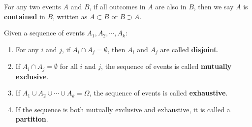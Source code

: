 \documentclass{huhtakm-template-book-v2}
\begin{document}
    \begin{sdefn}
        For any two events $A$ and $B$, if all outcomes in $A$ are also in $B$, then we say $A$ is \textbf{contained} in $B$, written as $A \subset B$ or $B \supset A$.
    \end{sdefn}
    \begin{sdefn}
        Given a sequence of events $A_{1}, A_{2}, \cdots, A_{k}$:
        \begin{enumerate}
            \item For any $i$ and $j$, if $A_{i} \cap A_{j} = \emptyset$, then $A_{i}$ and $A_{j}$ are called \textbf{disjoint}.
            \item If $A_{i} \cap A_{j} = \emptyset$ for all $i$ and $j$, the sequence of events is called \textbf{mutually exclusive}.
            \item If $A_{1} \cup A_{2} \cup \cdots \cup A_{k} = \Omega$, the sequence of events is called \textbf{exhaustive}.
            \item If the sequence is both mutually exclusive and exhaustive, it is called a \textbf{partition}.
        \end{enumerate}
    \end{sdefn}
    \newpage
\end{document}
